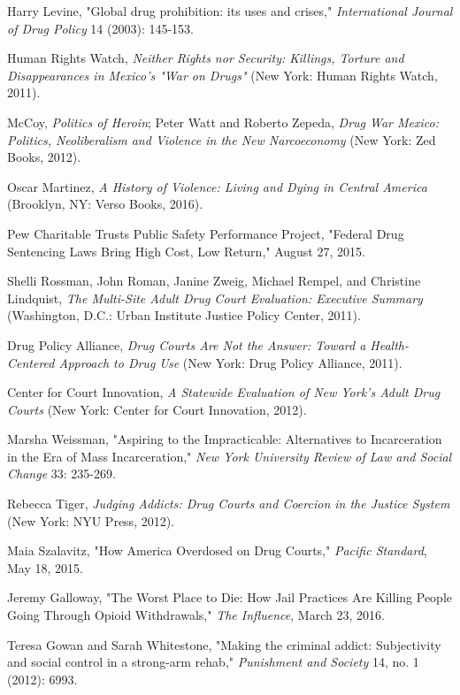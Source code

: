 \documentclass[fontset=fandol, a4paper, 12pt, openright]{ctexbook}
\begin{document}
\begin{enumerate}[label={[\arabic*]}]
    \item Harry Levine, "Global drug prohibition: its uses and crises," \textit{International Journal of Drug Policy} 14 (2003): 145-153.
    \item Human Rights Watch, \textit{Neither Rights nor Security: Killings, Torture and Disappearances in Mexico's "War on Drugs"} (New York: Human Rights Watch, 2011).
    \item McCoy, \textit{Politics of Heroin}; Peter Watt and Roberto Zepeda, \textit{Drug War Mexico: Politics, Neoliberalism and Violence in the New Narcoeconomy} (New York: Zed Books, 2012).
    \item Oscar Martinez, \textit{A History of Violence: Living and Dying in Central America} (Brooklyn, NY: Verso Books, 2016).
    \item Pew Charitable Trusts Public Safety Performance Project, "Federal Drug Sentencing Laws Bring High Cost, Low Return," August 27, 2015.
    \item Shelli Rossman, John Roman, Janine Zweig, Michael Rempel, and Christine Lindquist, \textit{The Multi-Site Adult Drug Court Evaluation: Executive Summary} (Washington, D.C.: Urban Institute Justice Policy Center, 2011).
    \item Drug Policy Alliance, \textit{Drug Courts Are Not the Answer: Toward a Health-Centered Approach to Drug Use} (New York: Drug Policy Alliance, 2011).
    \item Center for Court Innovation, \textit{A Statewide Evaluation of New York's Adult Drug Courts} (New York: Center for Court Innovation, 2012).
    \item Marsha Weissman, "Aspiring to the Impracticable: Alternatives to Incarceration in the Era of Mass Incarceration," \textit{New York University Review of Law and Social Change} 33: 235-269.
    \item Rebecca Tiger, \textit{Judging Addicts: Drug Courts and Coercion in the Justice System} (New York: NYU Press, 2012).
    \item Maia Szalavitz, "How America Overdosed on Drug Courts," \textit{Pacific Standard}, May 18, 2015.
    \item Jeremy Galloway, "The Worst Place to Die: How Jail Practices Are Killing People Going Through Opioid Withdrawals," \textit{The Influence}, March 23, 2016.
    \item Teresa Gowan and Sarah Whitestone, "Making the criminal addict: Subjectivity and social control in a strong-arm rehab," \textit{Punishment and Society} 14, no. 1 (2012): 6993.

\end{enumerate}
\end{document}
